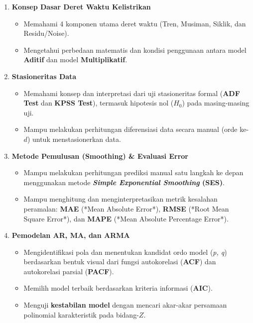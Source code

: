 \documentclass[11pt,a4paper]{article}
\begin{document}
\vspace{0.2cm}
\begin{enumerate}[label=\textbf{\arabic*.}, leftmargin=1.5em, itemsep=8pt]
    \item \textbf{Konsep Dasar Deret Waktu Kelistrikan}
    \begin{itemize}[label=$\circ$]
        \item Memahami 4 komponen utama deret waktu (Tren, Musiman, Siklik, dan Residu/Noise).
        \item Mengetahui perbedaan matematis dan kondisi penggunaan antara model \textbf{Aditif} dan model \textbf{Multiplikatif}.
    \end{itemize}

    \item \textbf{Stasioneritas Data}
    \begin{itemize}[label=$\circ$]
        \item Memahami konsep dan interpretasi dari uji stasioneritas formal (\textbf{ADF Test} dan \textbf{KPSS Test}), termasuk hipotesis nol ($H_0$) pada masing-masing uji.
        \item Mampu melakukan perhitungan diferensiasi data secara manual (orde ke-$d$) untuk menstasionerkan data.
    \end{itemize}

    \item \textbf{Metode Pemulusan (Smoothing) \& Evaluasi Error}
    \begin{itemize}[label=$\circ$]
        \item Mampu melakukan perhitungan prediksi manual satu langkah ke depan menggunakan metode \textbf{\textit{Simple Exponential Smoothing} (SES)}.
        \item Mampu menghitung dan menginterpretasikan metrik kesalahan peramalan: \textbf{MAE} (*Mean Absolute Error*), \textbf{RMSE} (*Root Mean Square Error*), dan \textbf{MAPE} (*Mean Absolute Percentage Error*).
    \end{itemize}

    \item \textbf{Pemodelan AR, MA, dan ARMA}
    \begin{itemize}[label=$\circ$]
        \item Mengidentifikasi pola dan menentukan kandidat ordo model (\textit{p, q}) berdasarkan bentuk visual dari fungsi autokorelasi (\textbf{ACF}) dan autokorelasi parsial (\textbf{PACF}).
        \item Memilih model terbaik berdasarkan kriteria informasi (\textbf{AIC}).
        \item Menguji \textbf{kestabilan model} dengan mencari akar-akar persamaan polinomial karakteristik pada bidang-$Z$.
    \end{itemize}


\end{enumerate}
\end{document}
